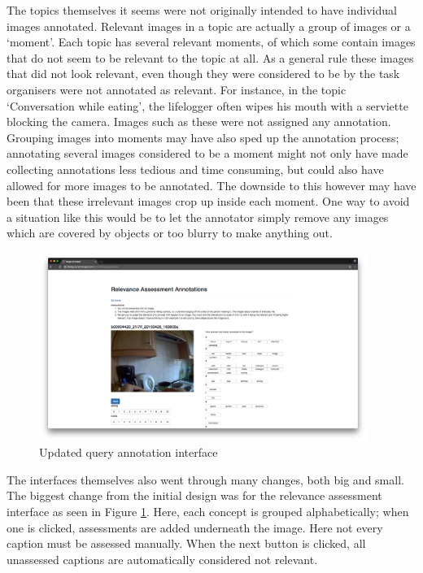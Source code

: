 The topics themselves it seems were not originally intended to have individual images annotated. Relevant images in a topic are actually a group of images or a `moment'. Each topic has several relevant moments, of which some contain images that do not seem to be relevant to the topic at all. As a general rule these images that did not look relevant, even though they were considered to be by the task organisers were not annotated as relevant. For instance, in the topic `Conversation while eating', the lifelogger often wipes his mouth with a serviette blocking the camera. Images such as these were not assigned any annotation. Grouping images into moments may have also sped up the annotation process; annotating several images considered to be a moment might not only have made collecting annotations less tedious and time consuming, but could also have allowed for more images to be annotated. The downside to this however may have been that these irrelevant images crop up inside each moment. One way to avoid a situation like this would be to let the annotator simply remove any images which are covered by objects or too blurry to make anything out.

\begin{figure}[h]
    \centering
    \includegraphics[width=0.95\textwidth]{images/new-rel-ass-interface}
    \caption{Updated query annotation interface}
    \label{fig:new-rel-ass}
\end{figure}

The interfaces themselves also went through many changes, both big and small. The biggest change from the initial design was for the relevance assessment interface as seen in Figure \ref{fig:new-rel-ass}. Here, each concept is grouped alphabetically; when one is clicked, assessments are added underneath the image. Here not every caption must be assessed manually. When the next button is clicked, all unassessed captions are automatically considered not relevant.

